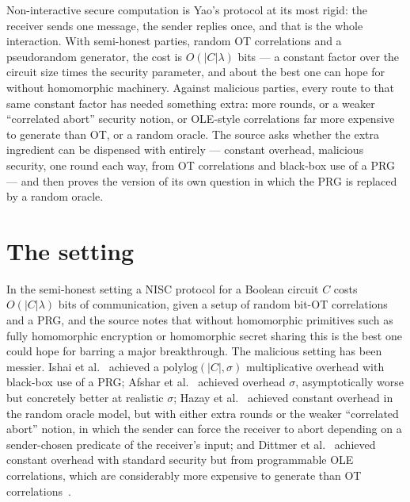 \documentclass{aicr-conjecture}
\begin{document}

\vspace{0.4em}

\begin{informalconjecture}
Non-interactive secure computation is Yao's protocol at its most rigid:
the receiver sends one message, the sender replies once, and that is the
whole interaction. With semi-honest parties, random OT correlations and a
pseudorandom generator, the cost is $O(|C|\lambda)$ bits --- a constant
factor over the circuit size times the security parameter, and about the
best one can hope for without homomorphic machinery. Against malicious
parties, every route to that same constant factor has needed something
extra: more rounds, or a weaker ``correlated abort'' security notion, or
OLE-style correlations far more expensive to generate than OT, or a
random oracle. The source asks whether the extra ingredient can be
dispensed with entirely --- constant overhead, malicious security, one
round each way, from OT correlations and black-box use of a PRG --- and
then proves the version of its own question in which the PRG is replaced
by a random oracle.
\end{informalconjecture}

\section{The setting}\label{sec:setting}

In the semi-honest setting a NISC protocol for a Boolean circuit $C$
costs $O(|C|\lambda)$ bits of communication, given a setup of random
bit-OT correlations and a PRG, and the source notes that without
homomorphic primitives such as fully homomorphic encryption or
homomorphic secret sharing this is the best one could hope for barring a
major breakthrough. The malicious setting has been messier. Ishai et
al.~\cite{IKO+11} achieved a $\mathrm{polylog}(|C|,\sigma)$
multiplicative overhead with black-box use of a PRG; Afshar et
al.~\cite{AMPR14} achieved overhead $\sigma$, asymptotically worse but
concretely better at realistic $\sigma$; Hazay et al.~\cite{HIV17}
achieved constant overhead in the random oracle model, but with either
extra rounds or the weaker ``correlated abort'' notion, in which the
sender can force the receiver to abort depending on a sender-chosen
predicate of the receiver's input; and Dittmer et al.~\cite{DILO22}
achieved constant overhead with standard security but from
programmable OLE correlations, which are considerably more expensive to
generate than OT correlations~\cite{BCG+19}.
\end{document}
